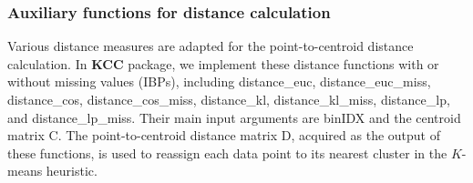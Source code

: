 \documentclass[acmsmall,screen,review]{acmart}
\begin{document}
\subsubsection{Auxiliary functions for distance calculation}
Various distance measures are adapted for the point-to-centroid distance calculation. In \textbf{KCC} package, we implement these distance functions with or without missing values (IBPs), including \textsf{distance\_euc}, \textsf{distance\_euc\_miss}, \textsf{distance\_cos}, \textsf{distance\_cos\_miss}, \textsf{distance\_kl}, \textsf{distance\_kl\_miss}, \textsf{distance\_lp}, and \textsf{distance\_lp\_miss}. Their main input arguments are \textsf{binIDX} and the centroid matrix \textsf{C}. The point-to-centroid distance matrix \textsf{D}, acquired as the output of these functions, is used to reassign each data point to its nearest cluster in the $K$-means heuristic.
\end{document}
